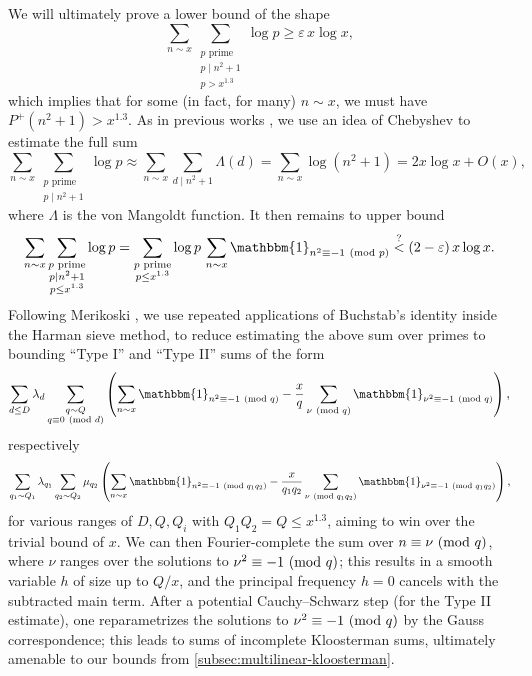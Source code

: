 \documentclass[reqno,11pt]{amsart}
\theoremstyle{remark}
\numberwithin{equation}{section}
\newcommand{\one}{\mathbbm{1}}
\newcommand{\eps}{\varepsilon}
\renewcommand{\pmod}[1]{\ (\textnormal{mod } #1)}
\begin{document}
We will ultimately prove a lower bound of the shape
\[
    \sum_{n \sim x} \sum_{\substack{p \text{ prime} \\ p \mid n^2+1 \\ p > x^{1.3}}} \log p
    \ge \eps\, x \log x,
\]
which implies that for some (in fact, for many) $n \sim x$, we must have $P^+(n^2+1) > x^{1.3}$. As in previous works \cite{merikoski2023largest,de2020niveau,deshouillers1982greatest,hooley1967greatest},  we use an idea of Chebyshev to estimate the full sum
\[
    \sum_{n \sim x} \sum_{\substack{p \text{ prime} \\ p \mid n^2+1}} \log p
    \approx 
    \sum_{n \sim x}
    \sum_{d \mid n^2+1} \Lambda(d)
    =
    \sum_{n \sim x} 
    \log(n^2+1)
    =
    2x\log x + O(x),
\]
where $\Lambda$ is the von Mangoldt function. It then remains to upper bound
\[
    \sum_{n \sim x} \sum_{\substack{p \text{ prime} \\ p \mid n^2+1 \\ p \le x^{1.3}}} \log p
    =
    \sum_{\substack{p \text{ prime} \\ p \le x^{1.3}}} \log p\,
    \sum_{n \sim x} \one_{n^2 \equiv -1 \pmod{p}}
    \stackrel{?}{<} (2-\eps)\,x \log x.
\]
Following Merikoski \cite{merikoski2023largest}, we use repeated applications of Buchstab's identity inside the Harman sieve method, to reduce estimating the above sum over primes to
bounding ``Type I'' and ``Type II'' sums of the form
\[
    \sum_{d \le D} \lambda_d \sum_{\substack{q \sim Q \\ q \equiv 0 \pmod{d}}} \left(
    \sum_{n \sim x} \one_{n^2 \equiv -1 \pmod{q}}
    -
    \frac{x}{q} \sum_{\nu \pmod{q}} \one_{\nu^2 \equiv -1 \pmod{q}}\right),
\]
respectively
\[
    \sum_{q_1 \sim Q_1} \lambda_{q_1} \sum_{q_2 \sim Q_2} \mu_{q_2} \left(
    \sum_{n \sim x} \one_{n^2 \equiv -1 \pmod{q_1 q_2}}
    -
    \frac{x}{q_1 q_2} \sum_{\nu \pmod{q_1q_2}} \one_{\nu^2 \equiv -1 \pmod{q_1q_2}}\right),
\]
for various ranges of $D, Q, Q_i$ with $Q_1 Q_2 = Q \le x^{1.3}$, aiming to win over the trivial bound of $x$. We can then Fourier-complete the sum over $n \equiv \nu \pmod{q}$, where $\nu$ ranges over the solutions to $\nu^2 \equiv -1 \pmod{q}$; this results in a smooth variable $h$ of size up to $Q/x$, and the principal frequency $h = 0$ cancels with the subtracted main term. After a potential Cauchy--Schwarz step (for the Type II estimate), one reparametrizes the solutions to $\nu^2 \equiv -1 \pmod{q}$ by the Gauss correspondence; this leads to sums of incomplete Kloosterman sums, ultimately amenable to our bounds from \cref{subsec:multilinear-kloosterman}.
\end{document}
